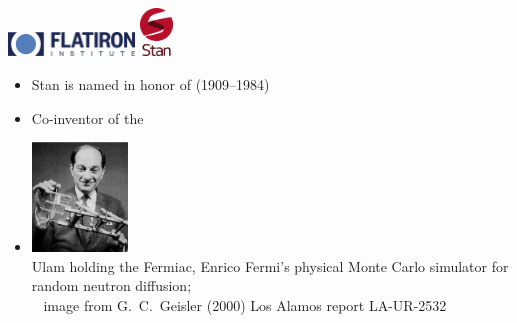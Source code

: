 \documentclass[10pt]{report}
\begin{document}
\sf%
\vspace*{-12pt}
%
\noindent 
\spc{\Huge\bfseries \color{MidnightBlue}{Stan under the hood}}
\\[16pt]
\noindent 
\spc{\Large\bfseries \color{MidnightBlue}{Bob Carpenter}}
\\[6pt]
\\
\\[12pt]
\hfill
\vfill
\hfill
\includegraphics[height=0.25in]{img/fi-logo.png}
\qquad 
\includegraphics[height=0.5in]{img/new-logo.png}

%
\begin{itemize}
\item Stan is named in honor of  (1909--1984)
\item Co-inventor of the 
\item[]
\vspace*{4pt}
  \includegraphics[width=0.2\textwidth]{img/ulam-fermiac.jpg}
\\[2pt] \footnotesize Ulam holding the Fermiac, Enrico Fermi's physical Monte Carlo simulator
  for random neutron diffusion; \hfill
\\[4pt]
{\tiny \mbox{ } \hfill image from G.~C.~Geisler (2000) Los Alamos report LA-UR-2532}
\end{itemize}
\end{document}
